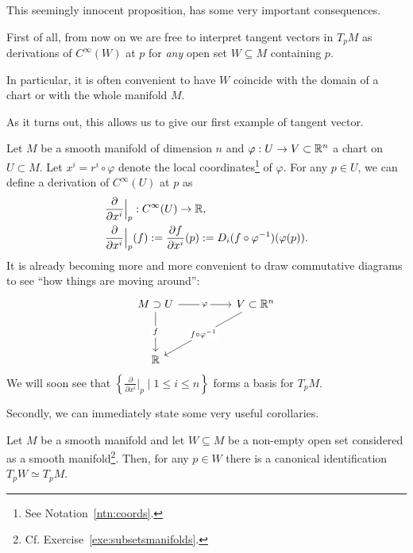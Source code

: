This seemingly innocent proposition, has some very important consequences.

\begin{tcolorbox}
	First of all, from now on we are free to interpret tangent vectors in $T_p M$ as derivations of $C^\infty(W)$ at $p$ for \emph{any} open set $W\subseteq M$ containing $p$.

	In particular, it is often convenient to have $W$ coincide with the domain of a chart or with the whole manifold $M$.
\end{tcolorbox}
As it turns out, this allows us to give our first example of tangent vector.

\begin{example}\label{ex:partialderivative}
	Let $M$ be a smooth manifold of dimension $n$ and $\varphi: U \to V\subset\mathbb{R}^n$ a chart on $U\subset M$.
	Let $x^i = r^i \circ \varphi$ denote the local coordinates\footnote{See Notation~\ref{ntn:coords}.} of $\varphi$.
	For any $p\in U$, we can define a derivation of $C^\infty(U)$ at $p$ as
	\begin{align}
		 & \frac{\partial}{\partial x^i}\Big|_p : C^\infty(U) \to \mathbb{R},                                                             \\
		 & \frac{\partial}{\partial x^i}\Big|_p (f) := \frac{\partial f}{\partial x^i}(p) := D_i(f\circ\varphi^{-1})(\varphi(p)).
	\end{align}
	It is already becoming more and more convenient to draw commutative diagrams to see ``how things are moving around'':
	\begin{equation}
		\begin{tikzcd}[column sep = huge, row sep = huge]
			M\supset U \arrow[r, "\varphi" description] \arrow[d, "f" description] & V \subset\R^n \arrow [dl, "f\circ\varphi^{-1}" description]\\
			\R &
		\end{tikzcd}
	\end{equation}
	We will soon see that $\left\{\frac{\partial}{\partial x^i}\Big|_p \mid 1\leq i\leq n\right\}$ forms a basis for $T_p M$.
\end{example}

Secondly, we can immediately state some very useful corollaries.

\begin{corollary}\label{cor:tgsubspace}
	Let $M$ be a smooth manifold and let $W\subseteq M$ be a non-empty open set considered as a smooth manifold\footnote{Cf. Exercise~\ref{exe:subsetsmanifolds}.}.
	Then, for any $p\in W$ there is a canonical identification $T_p W \simeq T_p M$.
\end{corollary}

